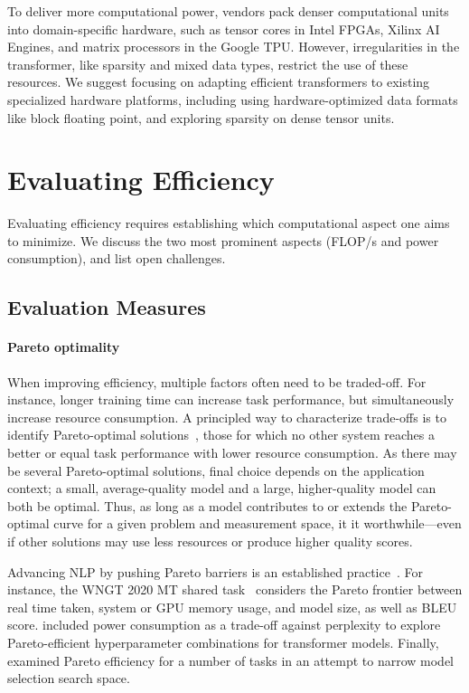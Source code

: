 To deliver more computational power, vendors pack denser computational units into domain-specific hardware, such as tensor cores in  Intel FPGAs, Xilinx AI Engines, and  matrix processors in the Google TPU. However, irregularities in the transformer, like sparsity and mixed data types, restrict the use of these  resources. We suggest focusing on adapting efficient transformers to existing specialized hardware platforms, including using hardware-optimized data formats like block floating point, and exploring sparsity on dense tensor units.

\section{Evaluating Efficiency} \label{sec:evaluation}

Evaluating efficiency requires establishing which computational aspect one aims to minimize. We discuss the two most prominent aspects (FLOP/s and power consumption), and list open challenges.

\subsection{Evaluation Measures} \label{subsec:measuring}
\paragraph{Pareto optimality} When improving efficiency, multiple factors often need to be traded-off. For instance, longer training time can increase task performance, but simultaneously increase resource consumption. A principled way to characterize trade-offs is to identify Pareto-optimal solutions~\citep{pareto1896cours}, those for which no other system reaches a better or equal task performance with lower resource consumption. As there may be several Pareto-optimal solutions, final choice depends on the application context; a small, average-quality model and a large, higher-quality model can both be optimal. Thus, as long as a model contributes to or extends the Pareto-optimal curve for a given problem and measurement space, it it worthwhile---even if other solutions may use less resources or produce higher quality scores.

Advancing NLP by pushing Pareto barriers is an established practice~\citep{kim-etal-2019-research,bogoychev-etal-2020-edinburghs,behnke-heafield-2021-pruning}. For instance, the WNGT 2020 MT shared task~\citep{ngt-2020-neural} considers the Pareto frontier between real time taken, system or GPU memory usage, and model size, as well as BLEU score. 
\citet{de2021hyperparameter} included power consumption as a trade-off against perplexity to explore Pareto-efficient hyperparameter combinations for transformer models. Finally, \citet{liutowards} examined Pareto efficiency for a number of tasks in an attempt to narrow model selection search space.

